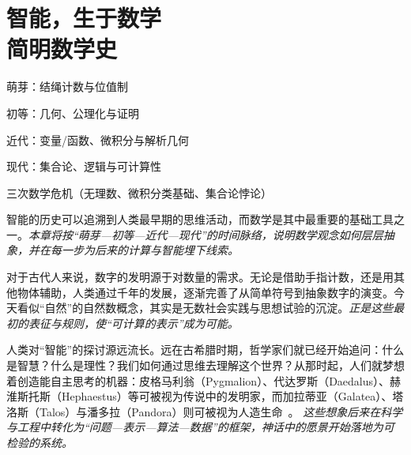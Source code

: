 
\chapter{智能，生于数学 \texorpdfstring{\\}{ }简明数学史}

\newenvironment{examplebox}
{\par\vspace{0.5em}\noindent\hrulefill\par\noindent{示例盒子：三跳链}\par\small}
{\par\noindent\hrulefill\vspace{0.5em}\normalsize\par}

\begin{introduction}
\item 萌芽：结绳计数与位值制
\item 初等：几何、公理化与证明
\item 近代：变量/函数、微积分与解析几何
\item 现代：集合论、逻辑与可计算性
\item 三次数学危机（无理数、微积分类基础、集合论悖论）
\end{introduction}


智能的历史可以追溯到人类最早期的思维活动，而数学是其中最重要的基础工具之一。\emph{本章将按“萌芽—初等—近代—现代”的时间脉络，说明数学观念如何层层抽象，并在每一步为后来的计算与智能埋下线索。}

对于古代人来说，数字的发明源于对数量的需求。无论是借助手指计数，还是用其他物体辅助，人类通过千年的发展，逐渐完善了从简单符号到抽象数字的演变。今天看似“自然”的自然数概念，其实是无数社会实践与思想试验的沉淀。\emph{正是这些最初的表征与规则，使“可计算的表示”成为可能。}

人类对“智能”的探讨源远流长。远在古希腊时期，哲学家们就已经开始追问：什么是智慧？什么是理性？我们如何通过思维去理解这个世界？从那时起，人们就梦想着创造能自主思考的机器：皮格马利翁（Pygmalion）、代达罗斯（Daedalus）、赫淮斯托斯（Hephaestus）等可被视为传说中的发明家，而加拉蒂亚（Galatea）、塔洛斯（Talos）与潘多拉（Pandora）则可被视为人造生命~{\cite{OvidMartin2004,Sparkes1996,Tandy1997}}。 \emph{这些想象后来在科学与工程中转化为“问题—表示—算法—数据”的框架，神话中的愿景开始落地为可检验的系统。}

